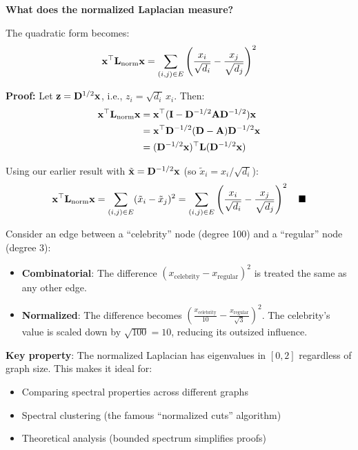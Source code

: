 \begin{notechapter}
\begin{mathbox}
\textbf{What does the normalized Laplacian measure?}

The quadratic form becomes:
\[
\mathbf{x}^\top \mathbf{L}_{\text{norm}} \mathbf{x} = \sum_{(i,j) \in E} \left( \frac{x_i}{\sqrt{d_i}} - \frac{x_j}{\sqrt{d_j}} \right)^2
\]

\textbf{Proof:} Let $\mathbf{z} = \mathbf{D}^{1/2} \mathbf{x}$, i.e., $z_i = \sqrt{d_i} \, x_i$. Then:
\begin{align*}
\mathbf{x}^\top \mathbf{L}_{\text{norm}} \mathbf{x} &= \mathbf{x}^\top (\mathbf{I} - \mathbf{D}^{-1/2} \mathbf{A} \mathbf{D}^{-1/2}) \mathbf{x} \\
&= \mathbf{x}^\top \mathbf{D}^{-1/2} (\mathbf{D} - \mathbf{A}) \mathbf{D}^{-1/2} \mathbf{x} \\
&= (\mathbf{D}^{-1/2}\mathbf{x})^\top \mathbf{L} (\mathbf{D}^{-1/2}\mathbf{x})
\end{align*}

Using our earlier result with $\tilde{\mathbf{x}} = \mathbf{D}^{-1/2}\mathbf{x}$ (so $\tilde{x}_i = x_i / \sqrt{d_i}$):
\[
\mathbf{x}^\top \mathbf{L}_{\text{norm}} \mathbf{x} = \sum_{(i,j) \in E} (\tilde{x}_i - \tilde{x}_j)^2 = \sum_{(i,j) \in E} \left( \frac{x_i}{\sqrt{d_i}} - \frac{x_j}{\sqrt{d_j}} \right)^2 \quad \blacksquare
\]
\end{mathbox}

\begin{example}
Consider an edge between a ``celebrity'' node (degree 100) and a ``regular'' node (degree 3):
\begin{itemize}
    \item \textbf{Combinatorial}: The difference $(x_{\text{celebrity}} - x_{\text{regular}})^2$ is treated the same as any other edge.
    \item \textbf{Normalized}: The difference becomes $\left( \frac{x_{\text{celebrity}}}{10} - \frac{x_{\text{regular}}}{\sqrt{3}} \right)^2$. The celebrity's value is scaled down by $\sqrt{100} = 10$, reducing its outsized influence.
\end{itemize}

\textbf{Key property}: The normalized Laplacian has eigenvalues in $[0, 2]$ regardless of graph size. This makes it ideal for:
\begin{itemize}
    \item Comparing spectral properties across different graphs
    \item Spectral clustering (the famous ``normalized cuts'' algorithm)
    \item Theoretical analysis (bounded spectrum simplifies proofs)
\end{itemize}
\end{example}


\end{notechapter}
